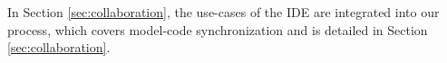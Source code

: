 

In Section \ref{sec:collaboration}, the use-cases of the IDE are integrated into
our process, which covers model-code synchronization and is detailed in Section \ref{sec:collaboration}.

